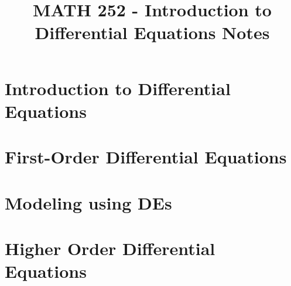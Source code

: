 \documentclass[12pt]{report}
\title{MATH 252 - Introduction to Differential Equations Notes}
\begin{document}
\maketitle
\tableofcontents

\chapter[Introduction to Diff-Eq]{Introduction to Differential Equations}\label{ch:introduction-to-differential-equations}

\chapter{First-Order Differential Equations}\label{ch:first-order-differential-equations}

\chapter{Modeling using DEs}\label{ch:modeling-using-des}

\chapter[Higher Order DE{s}]{Higher Order Differential Equations}\label{ch:higher-order-differential-equations}
\end{document}
